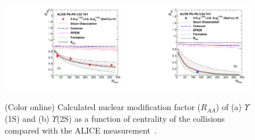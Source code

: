 \documentclass[12pt,a4paper,final]{iopart} %
\begin{document}
\begin{figure}
\includegraphics[width=0.49\textwidth]{Fig9a_Y1S_ALICE_RAANPart_Shade.pdf}
\includegraphics[width=0.49\textwidth]{Fig9b_Y2S_ALICE_RAANPart_Shade.pdf}
\caption{(Color online) Calculated nuclear modification factor ($R_{AA}$) of 
  (a) $\Upsilon$(1S) and (b) $\Upsilon$(2S) as a function of centrality of 
  the collisions compared with the ALICE measurement~\cite{ALICE:Y5TeV}.}
\label{fig:UpsilonRaaNPartALICE}
\end{figure}
\end{document}
